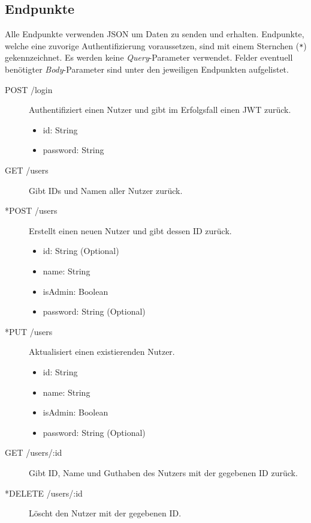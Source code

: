 \begin{appendix}
\chapter{Endpunkte}
\label{ch:appendix:routes}

Alle Endpunkte verwenden JSON um Daten zu senden und erhalten.
Endpunkte, welche eine zuvorige Authentifizierung voraussetzen, sind mit einem Sternchen (\verb|*|) gekennzeichnet.
Es werden keine \textit{Query}-Parameter verwendet.
Felder eventuell benötigter \textit{Body}-Parameter sind unter den jeweiligen Endpunkten aufgelistet.

\begin{description}
	\item[POST /login] Authentifiziert einen Nutzer und gibt im Erfolgsfall einen JWT zurück.
	\begin{itemize}
		\item id: String
		\item password: String
	\end{itemize}

	\item[GET /users] Gibt IDs und Namen aller Nutzer zurück.
	
	\item[*POST /users] Erstellt einen neuen Nutzer und gibt dessen ID zurück.
	\begin{itemize}
		\item id: String (Optional)
		\item name: String
		\item isAdmin: Boolean
		\item password: String (Optional)
	\end{itemize}

	\item[*PUT /users] Aktualisiert einen existierenden Nutzer.
	\begin{itemize}
		\item id: String
		\item name: String
		\item isAdmin: Boolean
		\item password: String (Optional)
	\end{itemize}

	\item[GET /users/:id] Gibt ID, Name und Guthaben des Nutzers mit der gegebenen ID zurück.
	
	\item[*DELETE /users/:id] Löscht den Nutzer mit der gegebenen ID.
	

\end{description}
\end{appendix}
